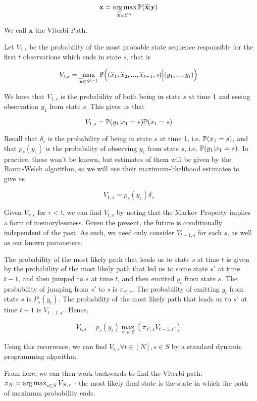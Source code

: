 $$
\mathbf{x} = \operatorname*{arg\,max}_{\widehat{\mathbf{x}} \in S^N} \mathbb{P}(\mathbf{\widehat{x}} | \mathbf{y})
$$

We call $\mathbf{x}$ the Viterbi Path.

Let $V_{t,s}$ be the probability of the most probable state sequence responsible for the first $t$ observations which ends in state $s$, that is

$$
V_{t,s} = \max_{\mathbf{\widehat{x}} \in S^{t-1}} \mathbb{P} \Big((\widehat{x}_1,\widehat{x}_2,...,\widehat{x}_{t-1},s) \Big| (y_1,...,y_t)\Big)
$$

We have that $V_{1,s}$ is the probability of both being in state $s$ at time 1 and seeing observation $y_1$ from state $s$. This gives us that

$$
V_{1,s} = \mathbb{P} (y_1|x_1 = s)\mathbb{P}(x_1=s)
$$

Recall that $\delta_s$ is the probability of being in state $s$ at time 1, i.e. $\mathbb{P}(x_1=s)$, and that $p_s(y_1)$ is the probability of observing $y_1$ from state $s$, i.e. $\mathbb{P} (y_1|x_1 = s)$. In practice, these won't be known, but estimates of them will be given by the Baum-Welch algorithm, so we will use their maximum-likelihood estimates to give us

$$
V_{1,s} = p_s(y_1)\delta_s
$$

Given $V_{\tau,s}$ for $\tau < t$, we can find $V_{t,s}$ by noting that the Markov Property implies a form of memorylessness. Given the present, the future is conditionally independent of the past. As such, we need only consider $V_{t-1,s}$ for each $s$, as well as our known parameters. 

The probability of the most likely path that leads us to state $s$ at time $t$ is given by the probability of the most likely path that led us to some state $s'$ at time $t-1$, and then jumped to $s$ at time $t$, and then emitted $y_t$ from state $s$. The probability of jumping from $s'$ to $s$ is $\pi_{s',s}$. The probability of emitting $y_t$ from state $s$ is $P_s(y_t)$. The probability of the most likely path that leads us to $s'$ at time $t-1$ is $V_{t-1,s'}$. Hence,

$$
V_{t,s} = p_s(y_t) \max_{s'\in S} (\pi_{s',s}V_{t-1,s'})
$$

Using this recurrence, we can find $V_{t,s} \forall t \in [N], s \in S$ by a standard dynamic programming algorithm.

From here, we can then work backwards to find the Viterbi path. $x_N = \operatorname*{arg\,max}_{s \in S} V_{N,s}$ - the most likely final state is the state in which the path of maximum probability ends.

